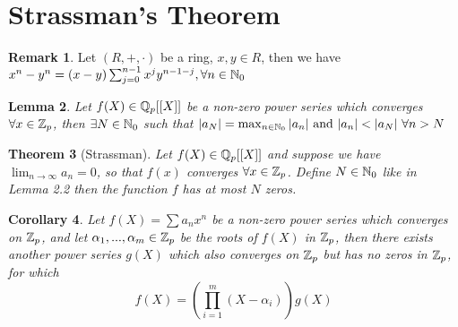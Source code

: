 \documentclass{article}
\theoremstyle{plain}
\newtheorem{thm}{Theorem}[section]
\newtheorem{lemm}[thm]{Lemma}
\newtheorem{Cor}[thm]{Corollary}
\theoremstyle{definition}
\newtheorem{rem}[thm]{Remark}
\begin{document}
\begin{minipage}[t]{0.49\textwidth}
		\section{Strassman's Theorem}
		\begin{rem}
		Let $(R, +, \cdot)$ be a ring, $x, y \in R$, then we have $x^{n}-y^{n} = (x-y)\sum_{j=0}^{n-1}x^{j}y^{n-1-j}, \forall n \in \Bbb N_{0}$
		\end{rem}
		\begin{lemm}
		Let $f(X) \in \Bbb Q_{p}[[X]]$ be a non-zero power series which converges $\forall x \in \Bbb Z_{p}$, then $\exists N \in \Bbb N_{0}$ such that $|a_{N}| = \max_{n \in \Bbb N_{0}}|a_{n}| \text{ and } |a_{n}| < |a_{N}|\ \forall n > N$
		\end{lemm}
		\begin{thm}[Strassman]
		Let $f(X) \in \Bbb Q_{p}[[X]]$ and suppose we have $\lim_{n \to \infty}a_{n} = 0$, so that $f(x)$ converges $\forall x \in \Bbb Z_{p}$. Define $N \in \Bbb N_{0}$ like in Lemma 2.2
		then the function $f$ has at most $N$ zeros.
		\end{thm}
		\begin{Cor} %
		Let $f(X) = \sum a_{n}x^{n}$ be a non-zero power series which converges on $\Bbb Z_{p}$, and let $\alpha_{1}, ..., \alpha_{m} \in \Bbb Z_{p}$ be the roots of $f(X)$ in $\Bbb Z_{p}$, then there exists another power series $g(X)$ which also converges on $\Bbb Z_{p}$ but has no zeros in $\Bbb Z_{p}$, for which
		$$f(X) = \left(\prod_{i=1}^{m}(X-\alpha_{i})\right)g(X)$$
		\end{Cor}
	\end{minipage}%
	\hfill
\end{document}
